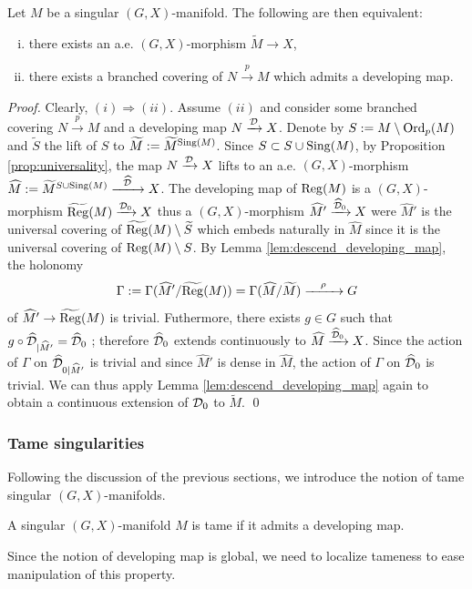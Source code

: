 \begin{prop} \label{prop:branched_devmap}Let $M$ be a singular $(G,X)$-manifold. The following are then equivalent:
\begin{enumerate}[(i)]
 \item there exists an a.e. $(G,X)$-morphism $\widetilde M\rightarrow X$,
 \item there exists a branched covering of $N\xrightarrow{p} M$ which admits a developing map.
\end{enumerate} 
\end{prop}
\begin{proof}
 Clearly, $(i)\Rightarrow (ii)$.  Assume $(ii)$ and consider some branched covering $N\xrightarrow{p}M$  and a developing map $N\xrightarrow{\mathcal{D}} X$. Denote by $S:=M\setminus \mathrm{Ord}_p(M)$ and $\widetilde S$  the lift of $S$ to $\widetilde M:=\widetilde M^{\mathrm{Sing}(M)}$.   
 Since  $S\subset S\cup \mathrm{Sing}(M)$, by Proposition \ref{prop:universality}, the  map $N \xrightarrow{\mathcal{D}} X$ lifts to an a.e. $(G,X)$-morphism $\widehat M := \widetilde M^{S\cup \mathrm{Sing}(M)}\xrightarrow{~~\widehat {\mathcal{D}}~~} X$. 
 The developing map of $\mathrm{Reg}(M)$ is a $(G,X)$-morphism $\widetilde{\mathrm{Reg}}(M)\xrightarrow{\mathcal{D}_0} X $ thus a $(G,X)$-morphism $ \widehat M' \xrightarrow{\widehat {\mathcal{D}}_0} X$ were $\widehat M'$ is the universal covering of $\widetilde{\mathrm{Reg}}(M)\setminus \widetilde S$ which embeds naturally in $\widehat M$ since it is the universal covering of $\mathrm{Reg}(M)\setminus S$. By Lemma \ref{lem:descend_developing_map}, the holonomy 
 $$\Gamma:=\Gamma(\widehat M'/\widetilde{\mathrm{Reg}}(M)) = \Gamma(\widehat M/\widetilde M) \xrightarrow{~~~\rho~~~} G$$ of $ \widehat M' \rightarrow \widetilde{\mathrm{Reg}}(M)$ is trivial. 
 Futhermore, there exists $g\in G$ such that $g\circ\widehat {\mathcal{D}}_{|\widehat M'} = \widehat {\mathcal{D}}_0$ ; therefore $\widehat {\mathcal{D}}_0$ extends continuously to $\widehat M \xrightarrow{\widehat {\mathcal{D}}_0} X$.  Since the action of $\Gamma$ on $\widehat{\mathcal{D}}_{0|\widehat M'}$ is trivial  and  since $\widehat M'$ is dense in $\widehat M$, the action of $\Gamma$ on $\widehat {\mathcal{D}}_0$ is trivial. We can thus apply Lemma \ref{lem:descend_developing_map} again to obtain a continuous extension of $\mathcal{D}_0$ to $\widetilde M$.
\qed\end{proof}


\subsubsection{Tame singularities}


Following the discussion of the previous sections, we introduce the notion of tame singular $(G,X)$-manifolds. 
\begin{defi}\label{def:singular_manifold_tame_admits}
 A singular $(G,X)$-manifold $M$ is tame if it admits a  developing map.
\end{defi}
Since the notion of developing map is global, we need to localize tameness to ease manipulation of this property.

